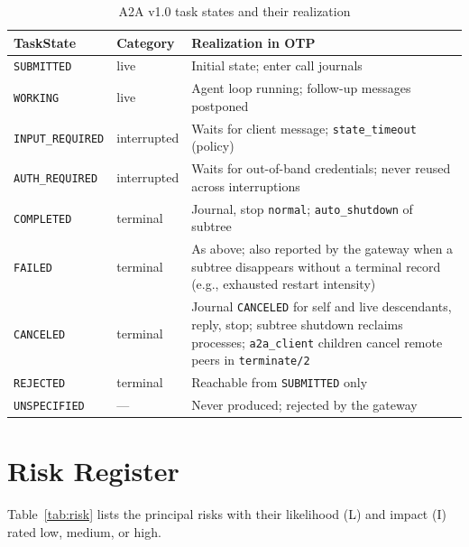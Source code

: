 \documentclass[conference,letterpaper]{IEEEtran}
\newcommand{\code}[1]{\texttt{#1}}
\begin{document}
\begin{table}[!h]
\centering
\caption{A2A v1.0 task states and their realization}
\label{tab:map}
\footnotesize
\renewcommand{\arraystretch}{1.12}
\begin{tabularx}{\textwidth}{@{}P{3.0cm}P{2.0cm}Y@{}}
\toprule
\textbf{TaskState} & \textbf{Category} & \textbf{Realization in OTP} \\
\midrule
\code{SUBMITTED} & live & Initial state; enter call journals \\
\code{WORKING} & live & Agent loop running; follow-up messages postponed \\
\code{INPUT\_REQUIRED} & interrupted & Waits for client message;
 \code{state\_timeout} (policy) \\
\code{AUTH\_REQUIRED} & interrupted & Waits for out-of-band credentials;
 never reused across interruptions \\
\code{COMPLETED} & terminal & Journal, stop \code{normal};
 \code{auto\_shutdown} of subtree \\
\code{FAILED} & terminal & As above; also reported by the gateway when a
 subtree disappears without a terminal record (e.g., exhausted restart
 intensity) \\
\code{CANCELED} & terminal & Journal \code{CANCELED} for self and live
 descendants, reply, stop; subtree shutdown reclaims processes;
 \code{a2a\_client} children cancel remote peers in \code{terminate/2} \\
\code{REJECTED} & terminal & Reachable from \code{SUBMITTED} only \\
\code{UNSPECIFIED} & --- & Never produced; rejected by the gateway \\
\bottomrule
\end{tabularx}
\end{table}

\section{Risk Register}\label{app:risk}

Table~\ref{tab:risk} lists the principal risks with their likelihood (L)
and impact (I) rated low, medium, or high.
\end{document}
